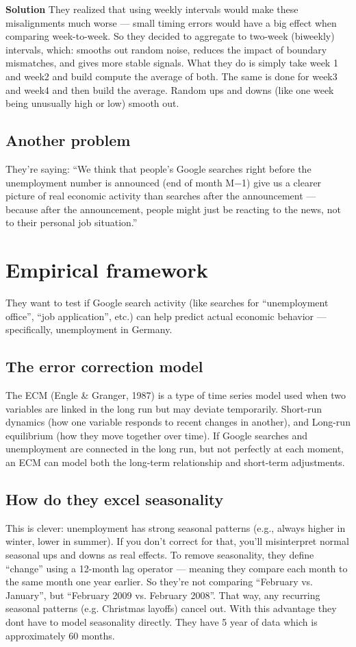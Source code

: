 \documentclass{article}
\begin{document}
\textbf{Solution}
They realized that using weekly intervals would make these misalignments much worse — small timing errors would have a big effect when comparing week-to-week. So they decided to aggregate to two-week (biweekly) intervals, which: smooths out random noise, reduces the impact of boundary mismatches, and gives more stable signals.
What they do is simply take week 1 and week2 and build compute the average of both. The same is done for week3 and week4 and then build the average. Random ups and downs (like one week being unusually high or low) smooth out.

\subsection{Another problem}
They’re saying: “We think that people’s Google searches right before the unemployment number is announced (end of month M−1) give us a clearer picture of real economic activity than searches after the announcement — because after the announcement, people might just be reacting to the news, not to their personal job situation.”

\section{Empirical framework}
They want to test if Google search activity (like searches for “unemployment office”, “job application”, etc.) can help predict actual economic behavior — specifically, unemployment in Germany.
\subsection{The error correction model}
The ECM (Engle & Granger, 1987) is a type of time series model used when two variables are linked in the long run but may deviate temporarily.
Short-run dynamics (how one variable responds to recent changes in another), and
Long-run equilibrium (how they move together over time).
If Google searches and unemployment are connected in the long run, but not perfectly at each moment, an ECM can model both the long-term relationship and short-term adjustments.

\subsection{How do they excel seasonality}
This is clever: unemployment has strong seasonal patterns (e.g., always higher in winter, lower in summer).
If you don’t correct for that, you’ll misinterpret normal seasonal ups and downs as real effects.
To remove seasonality, they define “change” using a 12-month lag operator — meaning they compare each month to the same month one year earlier.
So they’re not comparing “February vs. January”, but “February 2009 vs. February 2008”.
That way, any recurring seasonal patterns (e.g. Christmas layoffs) cancel out. With this advantage they dont have to model seasonality directly. 
They have 5 year of data which is approximately 60 months. 
\end{document}

